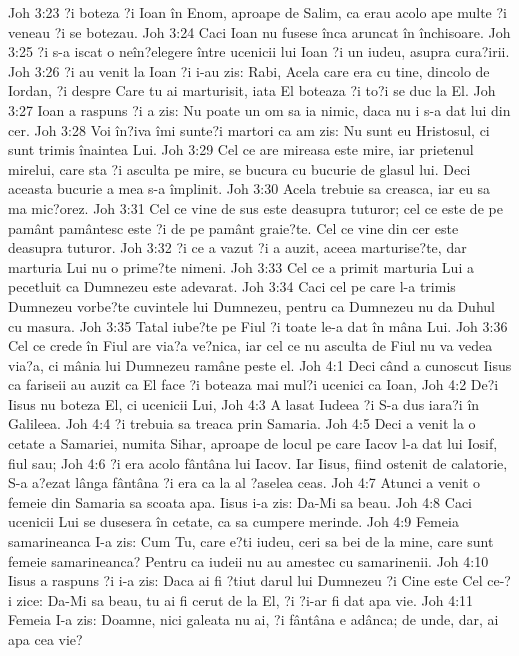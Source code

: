 Joh 3:23  ?i boteza ?i Ioan în Enom, aproape de Salim, ca erau acolo ape multe ?i veneau ?i se botezau.
Joh 3:24  Caci Ioan nu fusese înca aruncat în închisoare.
Joh 3:25  ?i s-a iscat o neîn?elegere între ucenicii lui Ioan ?i un iudeu, asupra cura?irii.
Joh 3:26  ?i au venit la Ioan ?i i-au zis: Rabi, Acela care era cu tine, dincolo de Iordan, ?i despre Care tu ai marturisit, iata El boteaza ?i to?i se duc la El.
Joh 3:27  Ioan a raspuns ?i a zis: Nu poate un om sa ia nimic, daca nu i s-a dat lui din cer.
Joh 3:28  Voi în?iva îmi sunte?i martori ca am zis: Nu sunt eu Hristosul, ci sunt trimis înaintea Lui.
Joh 3:29  Cel ce are mireasa este mire, iar prietenul mirelui, care sta ?i asculta pe mire, se bucura cu bucurie de glasul lui. Deci aceasta bucurie a mea s-a împlinit.
Joh 3:30  Acela trebuie sa creasca, iar eu sa ma mic?orez.
Joh 3:31  Cel ce vine de sus este deasupra tuturor; cel ce este de pe pamânt pamântesc este ?i de pe pamânt graie?te. Cel ce vine din cer este deasupra tuturor.
Joh 3:32  ?i ce a vazut ?i a auzit, aceea marturise?te, dar marturia Lui nu o prime?te nimeni.
Joh 3:33  Cel ce a primit marturia Lui a pecetluit ca Dumnezeu este adevarat.
Joh 3:34  Caci cel pe care l-a trimis Dumnezeu vorbe?te cuvintele lui Dumnezeu, pentru ca Dumnezeu nu da Duhul cu masura.
Joh 3:35  Tatal iube?te pe Fiul ?i toate le-a dat în mâna Lui.
Joh 3:36  Cel ce crede în Fiul are via?a ve?nica, iar cel ce nu asculta de Fiul nu va vedea via?a, ci mânia lui Dumnezeu ramâne peste el.
Joh 4:1  Deci când a cunoscut Iisus ca fariseii au auzit ca El face ?i boteaza mai mul?i ucenici ca Ioan,
Joh 4:2  De?i Iisus nu boteza El, ci ucenicii Lui,
Joh 4:3  A lasat Iudeea ?i S-a dus iara?i în Galileea.
Joh 4:4  ?i trebuia sa treaca prin Samaria.
Joh 4:5  Deci a venit la o cetate a Samariei, numita Sihar, aproape de locul pe care Iacov l-a dat lui Iosif, fiul sau;
Joh 4:6  ?i era acolo fântâna lui Iacov. Iar Iisus, fiind ostenit de calatorie, S-a a?ezat lânga fântâna ?i era ca la al ?aselea ceas.
Joh 4:7  Atunci a venit o femeie din Samaria sa scoata apa. Iisus i-a zis: Da-Mi sa beau.
Joh 4:8  Caci ucenicii Lui se dusesera în cetate, ca sa cumpere merinde.
Joh 4:9  Femeia samarineanca I-a zis: Cum Tu, care e?ti iudeu, ceri sa bei de la mine, care sunt femeie samarineanca? Pentru ca iudeii nu au amestec cu samarinenii.
Joh 4:10  Iisus a raspuns ?i i-a zis: Daca ai fi ?tiut darul lui Dumnezeu ?i Cine este Cel ce-?i zice: Da-Mi sa beau, tu ai fi cerut de la El, ?i ?i-ar fi dat apa vie.
Joh 4:11  Femeia I-a zis: Doamne, nici galeata nu ai, ?i fântâna e adânca; de unde, dar, ai apa cea vie?
